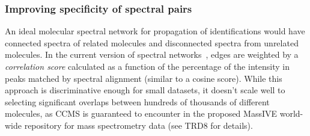 \documentclass[arial,11pt]{article}
\begin{document}
\subsubsection{Improving specificity of spectral pairs}\label{trd.snets.aim.molnets.edges}

%

An ideal molecular spectral network for propagation of identifications would have connected spectra of related molecules and disconnected spectra from unrelated molecules.
In the current version of spectral networks~\cite{bandeira07pnas}, edges are weighted by a \emph{correlation score} calculated as a function of the percentage of the intensity in peaks matched by spectral alignment (similar to a cosine score). While this approach is discriminative enough for small datasets, it doesn't scale well to selecting significant overlaps between hundreds of thousands of different molecules, as CCMS is guaranteed to encounter in the proposed MassIVE world-wide repository for mass spectrometry data (see TRD8 for details).
\end{document}

